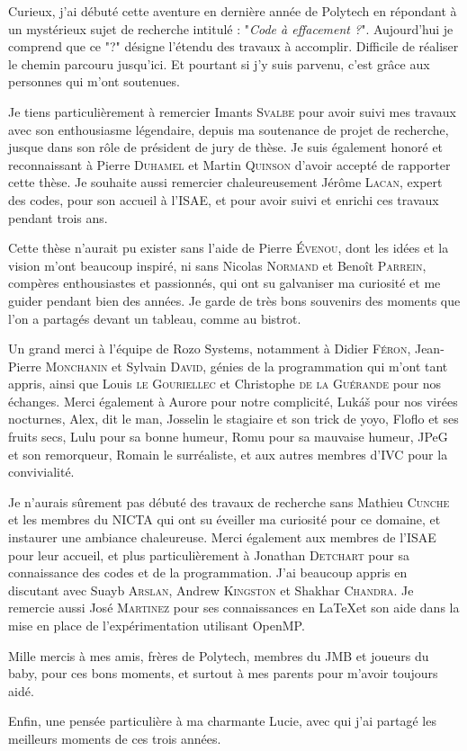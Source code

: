 
Curieux, j'ai débuté cette aventure en dernière année de Polytech en répondant
à un mystérieux sujet de recherche intitulé : "\emph{Code à effacement ?}".
Aujourd'hui je comprend que ce "?" désigne l'étendu des travaux à accomplir.
Difficile de réaliser le chemin parcouru jusqu'ici. Et pourtant si j'y suis
parvenu, c'est grâce aux personnes qui m'ont soutenues.

Je tiens particulièrement à remercier Imants \textsc{Svalbe} pour avoir suivi
mes travaux avec son enthousiasme légendaire, depuis ma soutenance de projet de
recherche, jusque dans son rôle de président de jury de thèse.
Je suis également honoré et reconnaissant à Pierre \textsc{Duhamel} et Martin
\textsc{Quinson} d'avoir accepté de rapporter cette thèse.
Je souhaite aussi remercier chaleureusement Jérôme \textsc{Lacan}, expert des
codes, pour son accueil à l'ISAE, et pour avoir suivi et enrichi ces travaux
pendant trois ans.

Cette thèse n'aurait pu exister sans l'aide de Pierre \textsc{Évenou}, dont les
idées et la vision m'ont beaucoup inspiré, ni sans Nicolas \textsc{Normand}
et Benoît \textsc{Parrein}, compères enthousiastes et passionnés, qui ont
su galvaniser ma curiosité et me guider pendant bien des années. Je garde de
très bons souvenirs des moments que l'on a partagés devant un tableau, comme au
bistrot.

Un grand merci à l'équipe de Rozo Systems, notamment à Didier \textsc{Féron},
Jean-Pierre \textsc{Monchanin} et Sylvain \textsc{David}, génies de la
programmation qui m'ont tant appris, ainsi que Louis \textsc{le Gouriellec} et
Christophe \textsc{de la Guérande} pour nos échanges.
Merci également à Aurore pour notre complicité, Lukáš pour nos virées
nocturnes, Alex, dit le man, Josselin le stagiaire et son trick de yoyo, Floflo
et ses fruits secs, Lulu pour sa bonne humeur, Romu pour sa mauvaise humeur,
JPeG et son remorqueur, Romain le surréaliste, et aux autres membres d'IVC pour
la convivialité.

Je n'aurais sûrement pas débuté des travaux de recherche sans Mathieu
\textsc{Cunche} et les membres du NICTA qui ont su éveiller ma curiosité pour
ce domaine, et instaurer une ambiance chaleureuse.
Merci également aux membres de l'ISAE pour leur accueil, et plus
particulièrement à Jonathan \textsc{Detchart} pour sa connaissance des codes et
de la programmation. J'ai beaucoup appris en discutant avec Suayb
\textsc{Arslan}, Andrew \textsc{Kingston} et Shakhar \textsc{Chandra}. Je
remercie aussi José \textsc{Martinez} pour ses connaissances en \LaTeX et son
aide dans la mise en place de l'expérimentation utilisant OpenMP.

Mille mercis à mes amis, frères de Polytech, membres du JMB et joueurs du
baby, pour ces bons moments, et surtout à mes parents pour m'avoir toujours
aidé.

Enfin, une pensée particulière à ma charmante Lucie, avec qui j'ai partagé les
meilleurs moments de ces trois années.

